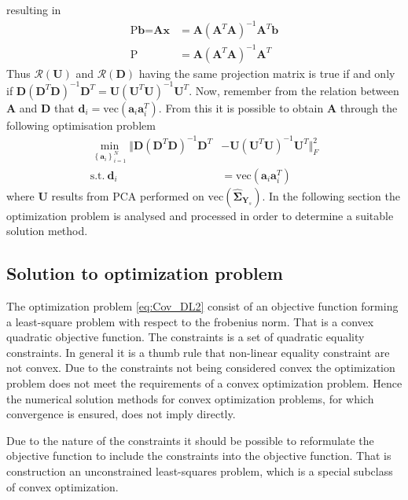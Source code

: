 resulting in
\begin{align*}
\text{P}\textbf{b} = \textbf{Ax} &= \textbf{A}(\textbf{A}^T\textbf{A})^{-1}\textbf{A}^T\textbf{b}\\
\text{P} &= \textbf{A}(\textbf{A}^T\textbf{A})^{-1}\textbf{A}^T 
\end{align*} 
Thus $\mathcal{R}(\textbf{U})$ and $\mathcal{R}(\textbf{D})$ having the same projection matrix is true if and only if $\textbf{D}(\textbf{D}^T\textbf{D})^{-1}\textbf{D}^T=\textbf{U}(\textbf{U}^T\textbf{U})^{-1}\textbf{U}^T$. 
Now, remember from the relation between $\textbf{A}$ and $\textbf{D}$ that $\textbf{d}_i = \text{vec}(\textbf{a}_i\textbf{a}_i^T)$. 
From this it is possible to obtain $\textbf{A}$ through the following optimisation problem 
\begin{align}
\min_{\left\{\textbf{a}_i\right\}_{i = 1}^{N}}\Vert  \textbf{D}(\textbf{D}^T\textbf{D})^{-1}\textbf{D}^T &- \textbf{U}(\textbf{U}^T\textbf{U})^{-1}\textbf{U}^T \Vert_{F}^{2} \nonumber \\
\text{s.t.} \ \textbf{d}_i&=\text{vec}(\textbf{a}_i\textbf{a}_i^T)\label{eq:Cov_DL2}
\end{align}      
where $\textbf{U}$ results from PCA performed on $\text{vec}(\widehat{\boldsymbol{\Sigma}}_{\textbf{Y}_s})$.
In the following section the optimization problem is analysed and processed in order to determine a suitable solution method. 

\subsection{Solution to optimization problem}
The optimization problem \eqref{eq:Cov_DL2} consist of an objective function forming a least-square problem with respect to the frobenius norm.
That is a convex quadratic objective function.
The constraints is a set of quadratic equality constraints. In general it is a thumb rule that non-linear equality constraint are not convex.
Due to the constraints not being considered convex the optimization problem does not meet the requirements of a convex optimization problem. Hence the numerical solution methods for convex optimization problems, for which convergence is ensured, does not imply directly. 

Due to the nature of the constraints it should be possible to reformulate the objective function to include the constraints into the objective function. That is construction an unconstrained least-squares problem, which is a special subclass of convex optimization\cite{cvxbook}.

